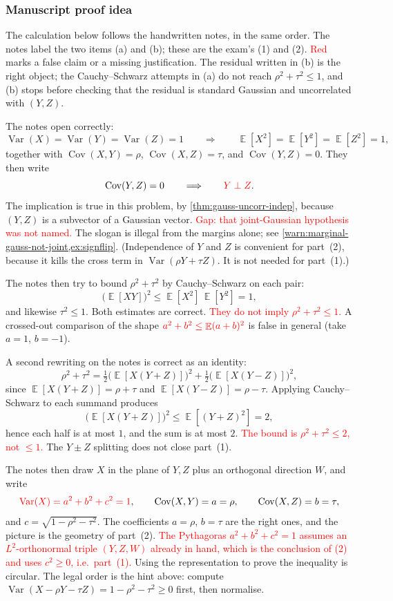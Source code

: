 \documentclass[11pt,a4paper]{article}
\newcommand{\mserr}[1]{\textcolor{red}{#1}}
\DeclareMathOperator{\Var}{Var}
\DeclareMathOperator{\E}{\mathbb{E}}
\begin{document}
\subsubsection{Manuscript proof idea}

The calculation below follows the handwritten notes, in the same order. The notes label the two items (a) and (b); these are the exam's (1) and (2). \mserr{Red} marks a false claim or a missing justification. The residual written in (b) is the right object; the Cauchy--Schwarz attempts in (a) do not reach \( \rho^{2}+\tau^{2}\le 1 \), and (b) stops before checking that the residual is standard Gaussian and uncorrelated with \( (Y,Z) \).

The notes open correctly:
\[
\Var(X)=\Var(Y)=\Var(Z)=1
\qquad\Longrightarrow\qquad
\E[X^{2}]=\E[Y^{2}]=\E[Z^{2}]=1,
\]
together with \( \operatorname{Cov}(X,Y)=\rho \), \( \operatorname{Cov}(X,Z)=\tau \), and \( \operatorname{Cov}(Y,Z)=0 \). They then write
\[
\operatorname{Cov}(Y,Z)=0
\qquad\Longrightarrow\qquad
\mserr{Y\perp Z}.
\]
The implication is true in this problem, by \cref{thm:gauss-uncorr-indep}, because \( (Y,Z) \) is a subvector of a Gaussian vector. \mserr{Gap: that joint-Gaussian hypothesis was not named.} The slogan is illegal from the margins alone; see \cref{warn:marginal-gauss-not-joint,ex:signflip}. (Independence of \( Y \) and \( Z \) is convenient for part~(2), because it kills the cross term in \( \Var(\rho Y+\tau Z) \). It is not needed for part~(1).)

The notes then try to bound \( \rho^{2}+\tau^{2} \) by Cauchy--Schwarz on each pair:
\[
\bigl(\E[XY]\bigr)^{2}
\le
\E[X^{2}]\,\E[Y^{2}]
=
1,
\]
and likewise \( \tau^{2}\le 1 \). Both estimates are correct. \mserr{They do not imply \( \rho^{2}+\tau^{2}\le 1 \).} A crossed-out comparison of the shape \( \mserr{a^{2}+b^{2}\le \E(a+b)^{2}} \) is false in general (take \( a=1 \), \( b=-1 \)).

A second rewriting on the notes is correct as an identity:
\[
\rho^{2}+\tau^{2}
=
\tfrac12\bigl(\E[X(Y+Z)]\bigr)^{2}
+
\tfrac12\bigl(\E[X(Y-Z)]\bigr)^{2},
\]
since \( \E[X(Y+Z)]=\rho+\tau \) and \( \E[X(Y-Z)]=\rho-\tau \). Applying Cauchy--Schwarz to each summand produces
\[
\bigl(\E[X(Y+Z)]\bigr)^{2}
\le
\E[(Y+Z)^{2}]
=
2,
\]
hence each half is at most \( 1 \), and the sum is at most \( 2 \). \mserr{The bound is \( \rho^{2}+\tau^{2}\le 2 \), not \( \le 1 \).} The \( Y\pm Z \) splitting does not close part~(1).

The notes then draw \( X \) in the plane of \( Y,Z \) plus an orthogonal direction \( W \), and write
\[
\mserr{\Var(X)=a^{2}+b^{2}+c^{2}=1},
\qquad
\operatorname{Cov}(X,Y)=a=\rho,
\qquad
\operatorname{Cov}(X,Z)=b=\tau,
\]
and \( c=\sqrt{1-\rho^{2}-\tau^{2}} \).
The coefficients \( a=\rho \), \( b=\tau \) are the right ones, and the picture is the geometry of part~(2). \mserr{The Pythagoras \( a^{2}+b^{2}+c^{2}=1 \) assumes an \( L^{2} \)-orthonormal triple \( (Y,Z,W) \) already in hand, which is the conclusion of (2) and uses \( c^{2}\ge 0 \), i.e.\ part~(1).} Using the representation to prove the inequality is circular. The legal order is the hint above: compute \( \Var(X-\rho Y-\tau Z)=1-\rho^{2}-\tau^{2}\ge 0 \) first, then normalise.
\end{document}
